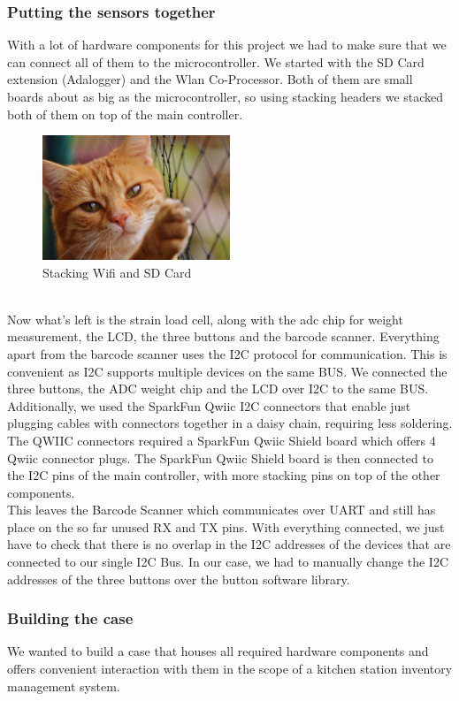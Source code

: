 \documentclass{article}
\begin{document}
\subsubsection{Putting the sensors together}
With a lot of hardware components for this project we had to make sure that we can connect all of them to the microcontroller.
We started with the SD Card extension (Adalogger) and the Wlan Co-Processor. Both of them are small boards about as big as the microcontroller, so using stacking headers we stacked both of them on top of the main controller.\\
\begin{figure}[h]
	\centering
	\includegraphics[width=0.5\textwidth]{cat.jpg}
	\caption{Stacking Wifi and SD Card}
	\label{fig:mesh1}
\end{figure}\\
Now what's left is the strain load cell, along with the adc chip for weight measurement, the LCD, the three buttons and the barcode scanner.
Everything apart from the barcode scanner uses the I2C protocol for communication. This is convenient as I2C supports multiple devices on the same BUS.
We connected the three buttons, the ADC weight chip and the LCD over I2C to the same BUS. Additionally, we used the SparkFun Qwiic I2C connectors that enable just plugging cables with
connectors together in a daisy chain, requiring less soldering. The QWIIC connectors required a SparkFun Qwiic Shield board which offers 4 Qwiic connector plugs.
The SparkFun Qwiic Shield board is then connected to the I2C pins of the main controller, with more stacking pins on top of the other components.\\
This leaves the Barcode Scanner which communicates over UART and still has place on the so far unused RX and TX pins.
With everything connected, we just have to check that there is no overlap in the I2C addresses of the devices that are connected to our single I2C Bus.
In our case, we had to manually change the I2C addresses of the three buttons over the button software library.
\subsubsection{Building the case}
We wanted to build a case that houses all required hardware components and offers convenient interaction with them in the scope of a kitchen station inventory management system.
\end{document}
